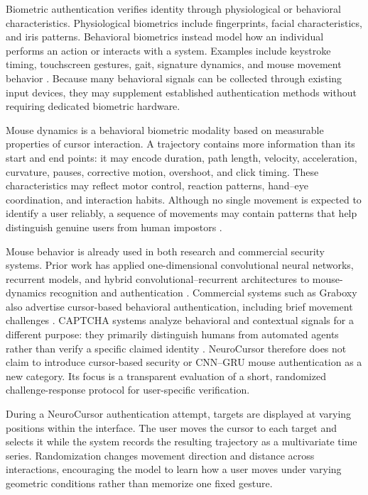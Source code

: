 \documentclass[conference]{IEEEtran}
\begin{document}
Biometric authentication verifies identity through physiological or
behavioral characteristics. Physiological biometrics include fingerprints,
facial characteristics, and iris patterns. Behavioral biometrics instead
model how an individual performs an action or interacts with a system.
Examples include keystroke timing, touchscreen gestures, gait, signature
dynamics, and mouse movement behavior \cite{nistBiometrics,khanMouseSurvey}.
Because many behavioral signals can be collected through existing input
devices, they may supplement established authentication methods without
requiring dedicated biometric hardware.

Mouse dynamics is a behavioral biometric modality based on measurable
properties of cursor interaction. A trajectory contains more information
than its start and end points: it may encode duration, path length, velocity,
acceleration, curvature, pauses, corrective motion, overshoot, and click
timing. These characteristics may reflect motor control, reaction patterns,
hand--eye coordination, and interaction habits. Although no single movement
is expected to identify a user reliably, a sequence of movements may contain
patterns that help distinguish genuine users from human impostors
\cite{khanMouseSurvey,deutschmannContinuousAuthentication}.

Mouse behavior is already used in both research and commercial security
systems. Prior work has applied one-dimensional convolutional neural
networks, recurrent models, and hybrid convolutional--recurrent
architectures to mouse-dynamics recognition and authentication
\cite{antalMouseCNN,guptaMouseRecognition,wangLTAMouse}. Commercial systems
such as Graboxy also advertise cursor-based behavioral authentication,
including brief movement challenges \cite{graboxyContinuous}. CAPTCHA
systems analyze behavioral and contextual signals for a different purpose:
they primarily distinguish humans from automated agents rather than verify
a specific claimed identity \cite{googleRecaptcha}. NeuroCursor therefore
does not claim to introduce cursor-based security or CNN--GRU mouse
authentication as a new category. Its focus is a transparent evaluation of
a short, randomized challenge-response protocol for user-specific
verification.

During a NeuroCursor authentication attempt, targets are displayed at
varying positions within the interface. The user moves the cursor to each
target and selects it while the system records the resulting trajectory as a
multivariate time series. Randomization changes movement direction and
distance across interactions, encouraging the model to learn how a user
moves under varying geometric conditions rather than memorize one fixed
gesture.
\end{document}
